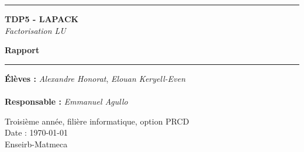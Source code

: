 \thispagestyle{empty}


%
\hrule
\begin{flushleft}
\Huge{\textbf{TDP5 - LAPACK}}\\
\textit{Factorisation LU}
\end{flushleft}
\begin{flushright}
\huge\textbf{Rapport}\\
\end{flushright}
\hrule

\vspace{80pt}
\noindent\textbf{Élèves :}
\emph{Alexandre Honorat}, \emph{Elouan Keryell-Even}\\
\\
\noindent\textbf{Responsable :}
\emph{Emmanuel Agullo}\\


\vspace{60pt}
\normalsize
\begin{center}
  Troisième année, filière informatique, option PRCD\\
  Date : \today\\
  Enseirb-Matmeca
\end{center}
\vspace{50pt}
